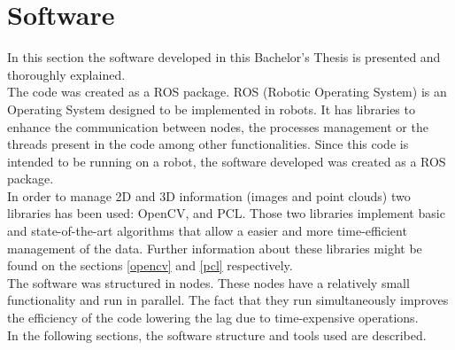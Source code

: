 \chapter{Software}
\label{software}
In this section the software developed in this Bachelor's Thesis is presented and thoroughly explained. 
\\

The code was created as a ROS package. ROS (Robotic Operating System) is an Operating System designed to be implemented in robots. It has libraries to enhance the communication between nodes, the processes management or the threads present in the code among other functionalities. 
Since this code is intended to be running on a robot, the software developed was created as a ROS package. 
\\

In order to manage 2D and 3D information (images and point clouds) two libraries has been used: OpenCV, and PCL. Those two libraries implement basic and state-of-the-art algorithms that allow a easier and more time-efficient management of the data. Further information about these libraries might be found on the sections \ref{opencv} and \ref{pcl} respectively. 
\\

The software was structured in nodes. These nodes have a relatively small functionality and run in parallel. The fact that they run simultaneously improves the efficiency of the code lowering the lag due to time-expensive operations. 
\\

In the following sections, the software structure and tools used are described. 

\newpage



\newpage

 
\newpage


\newpage



